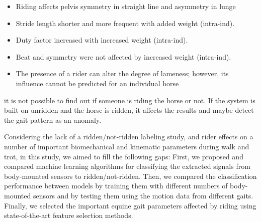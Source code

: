 \begin{itemize}
\item Riding affects pelvis symmetry in straight line and asymmetry in lunge
\item Stride length shorter and more frequent with added weight (intra-ind). 
\item Duty factor increased with increased weight (intra-ind). 
\item Beat and symmetry were not affected by increased weight (intra-ind).
\item The presence of a rider can alter the degree of lameness; however, its influence cannot be predicted for an individual horse
\end{itemize}

it is not possible to find out if someone is riding the horse or not. If the system is built on unridden and the horse is ridden, it affects the results and maybe detect the gait pattern as an anomaly.

Considering the lack of a ridden/not-ridden labeling study, and rider effects on a number of important biomechanical and kinematic parameters during walk and trot, in this study, we aimed to fill the following gaps: First, we proposed and compared machine learning algorithms for classifying the extracted signals from body-mounted sensors to ridden/not-ridden. Then, we compared the classification performance between models by training them with different numbers of body-mounted sensors and by testing them using the motion data from different gaits. Finally, we selected the important equine gait parameters affected by riding using state-of-the-art feature selection methods. 
